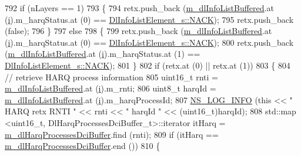 \begin{DoxyCode}
792       \textcolor{keywordflow}{if} (nLayers == 1)
793         \{
794           retx.push\_back (\hyperlink{classns3_1_1TdBetFfMacScheduler_ad28a9447cadd7f80c4fe5d3801d8828b}{m\_dlInfoListBuffered}.at (\hyperlink{bernuolliDistribution_8m_a6f6ccfcf58b31cb6412107d9d5281426}{i}).m\_harqStatus.at (0) == 
      \hyperlink{structns3_1_1DlInfoListElement__s_a3e55b89f756b7bd8909c8116a202a17aaf90e76e67c86729b4ee21927b7fb1770}{DlInfoListElement\_s::NACK});
795           retx.push\_back (\textcolor{keyword}{false});
796         \}
797       \textcolor{keywordflow}{else}
798         \{
799           retx.push\_back (\hyperlink{classns3_1_1TdBetFfMacScheduler_ad28a9447cadd7f80c4fe5d3801d8828b}{m\_dlInfoListBuffered}.at (\hyperlink{bernuolliDistribution_8m_a6f6ccfcf58b31cb6412107d9d5281426}{i}).m\_harqStatus.at (0) == 
      \hyperlink{structns3_1_1DlInfoListElement__s_a3e55b89f756b7bd8909c8116a202a17aaf90e76e67c86729b4ee21927b7fb1770}{DlInfoListElement\_s::NACK});
800           retx.push\_back (\hyperlink{classns3_1_1TdBetFfMacScheduler_ad28a9447cadd7f80c4fe5d3801d8828b}{m\_dlInfoListBuffered}.at (\hyperlink{bernuolliDistribution_8m_a6f6ccfcf58b31cb6412107d9d5281426}{i}).m\_harqStatus.at (1) == 
      \hyperlink{structns3_1_1DlInfoListElement__s_a3e55b89f756b7bd8909c8116a202a17aaf90e76e67c86729b4ee21927b7fb1770}{DlInfoListElement\_s::NACK});
801         \}
802       \textcolor{keywordflow}{if} (retx.at (0) || retx.at (1))
803         \{
804           \textcolor{comment}{// retrieve HARQ process information}
805           uint16\_t rnti = \hyperlink{classns3_1_1TdBetFfMacScheduler_ad28a9447cadd7f80c4fe5d3801d8828b}{m\_dlInfoListBuffered}.at (\hyperlink{bernuolliDistribution_8m_a6f6ccfcf58b31cb6412107d9d5281426}{i}).m\_rnti;
806           uint8\_t harqId = \hyperlink{classns3_1_1TdBetFfMacScheduler_ad28a9447cadd7f80c4fe5d3801d8828b}{m\_dlInfoListBuffered}.at (\hyperlink{bernuolliDistribution_8m_a6f6ccfcf58b31cb6412107d9d5281426}{i}).m\_harqProcessId;
807           \hyperlink{group__logging_gafbd73ee2cf9f26b319f49086d8e860fb}{NS\_LOG\_INFO} (\textcolor{keyword}{this} << \textcolor{stringliteral}{" HARQ retx RNTI "} << rnti << \textcolor{stringliteral}{" harqId "} << (uint16\_t)harqId);
808           std::map <uint16\_t, DlHarqProcessesDciBuffer\_t>::iterator itHarq = 
      \hyperlink{classns3_1_1TdBetFfMacScheduler_a94ed0382052c7b9665c5f04bce88fe6e}{m\_dlHarqProcessesDciBuffer}.find (rnti);
809           \textcolor{keywordflow}{if} (itHarq == \hyperlink{classns3_1_1TdBetFfMacScheduler_a94ed0382052c7b9665c5f04bce88fe6e}{m\_dlHarqProcessesDciBuffer}.end ())
810             \{

\end{DoxyCode}
